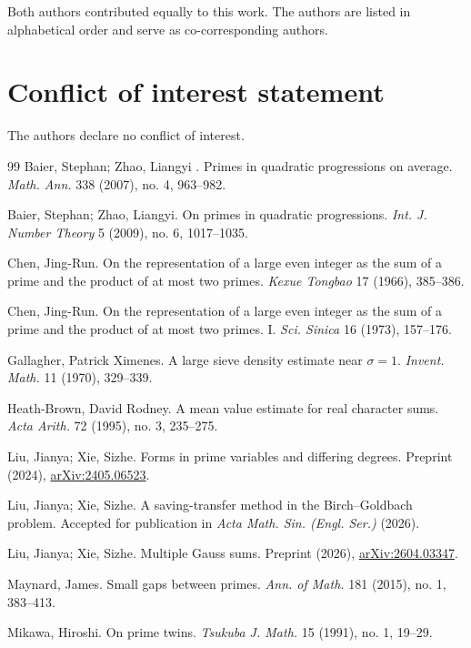 \documentclass[12pt,reqno]{amsart}
\numberwithin{equation}{section}
\theoremstyle{plain}
\theoremstyle{remark}
\begin{document}
Both authors contributed equally to this work.
The authors are listed in alphabetical order and serve as co-corresponding authors.

\section*{Conflict of interest statement}

The authors declare no conflict of interest.


\begin{thebibliography}{99}
Baier, Stephan; Zhao, Liangyi .
Primes in quadratic progressions on average.
\emph{Math. Ann.} 338 (2007), no. 4, 963--982.

Baier, Stephan; Zhao, Liangyi.
On primes in quadratic progressions.
\emph{Int. J. Number Theory} 5 (2009), no. 6, 1017--1035.


Chen, Jing-Run.
On the representation of a large even integer as the sum of a prime and the product of at most two primes.
\emph{Kexue Tongbao} 17 (1966), 385--386.


Chen, Jing-Run.
On the representation of a large even integer as the sum of a prime and the product of at most two primes. I.
\emph{Sci. Sinica} 16 (1973), 157--176.

Gallagher, Patrick Ximenes.
A large sieve density estimate near $\sigma=1$.
\emph{Invent. Math.} 11 (1970), 329--339.

Heath-Brown, David Rodney.
A mean value estimate for real character sums.
\emph{Acta Arith.} 72 (1995), no. 3, 235--275.

Liu, Jianya; Xie, Sizhe.
Forms in prime variables and differing degrees.
Preprint (2024),
\href{https://arxiv.org/abs/2405.06523}{arXiv:2405.06523}.

Liu, Jianya; Xie, Sizhe.
A saving-transfer method in the Birch--Goldbach problem.
Accepted for publication in \emph{Acta Math. Sin. (Engl. Ser.)} (2026).


Liu, Jianya; Xie, Sizhe.
Multiple Gauss sums.
Preprint (2026),
\href{https://arxiv.org/abs/2604.03347}{arXiv:2604.03347}.

Maynard, James.
Small gaps between primes.
\emph{Ann. of Math.} 181 (2015), no. 1, 383--413.

Mikawa, Hiroshi.
On prime twins.
\emph{Tsukuba J. Math.} 15 (1991), no. 1, 19--29.



\end{thebibliography}
\end{document}

